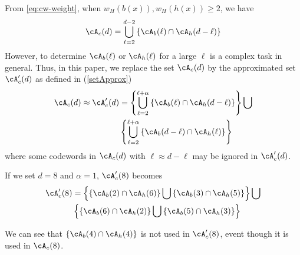 From \eqref{eq:cw-weight}, when $w_H(b(x)), w_H(h(x)) \geq 2$, we have
\begin{align}
\cA_c(d) = \bigcup_{\ell = 2}^{d-2} \left\{\cA_b(\ell) \cap \cA_h(d-\ell)\right\}
\label{Eq:exactset}
\end{align}
However, to determine $\cA_b(\ell)$ or $\cA_h(\ell)$ for a large $\ell$ is a complex task in general. Thus, in this paper, we replace the set $\cA_c(d)$ by the approximated set $\cA_c'(d)$ as defined in  (\ref{setApprox})
\begin{equation}
\begin{split}
\cA_c(d) \approx \cA_c'(d) &= \left\{\bigcup_{\ell = 2}^{\ell+\alpha} \left\{\cA_b(\ell) \cap \cA_h(d-\ell)\right\}\right\}\bigcup \\
&\left\{\bigcup_{\ell = 2}^{\ell+\alpha} \left\{\cA_b(d-\ell) \cap \cA_h(\ell)\right\}\right\}
\end{split}
\label{setApprox}
\end{equation}
where some codewords in $\cA_c(d)$ with $\ell \approx d-\ell$ may be ignored in $\cA_c'(d)$.
\begin{example}
If we set $d=8$ and  $\alpha=1$, $\cA_c'(8)$ becomes
\begin{equation*}
\begin{split}
\cA_c'(8) &=\left\{\left\{\cA_b(2) \cap \cA_h(6)\right\} \bigcup  \left\{\cA_b(3) \cap \cA_h(5)\right\} \right\} \bigcup \\
& \left\{\left\{\cA_b(6) \cap \cA_h(2)\right\} \bigcup  \left\{\cA_b(5) \cap \cA_h(3)\right\} \right\} \\
\end{split}
\end{equation*}

We can see that $\left\{\cA_b(4) \cap \cA_h(4)\right\}$ is not used in $\cA_c'(8)$, event though it is used in $\cA_c(8)$.
\end{example}





